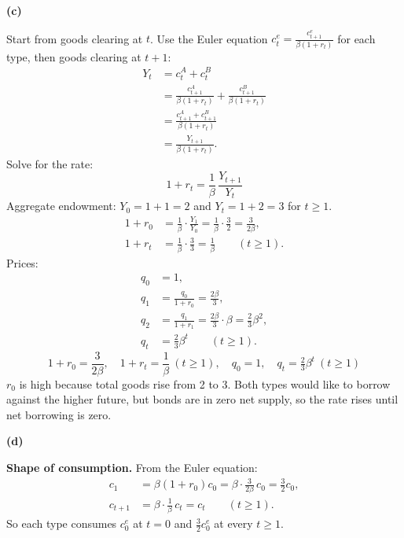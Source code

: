 \documentclass[12pt]{article}
\newcommand{\pt}[1]{\par\bigskip\textbf{(#1)}\par}
\newcommand{\ans}[1]{\[\boxed{\ #1\ }\]}
\begin{document}
\pt{c}
Start from goods clearing at $t$. Use the Euler equation
$c^e_t=\frac{c^e_{t+1}}{\beta(1+r_t)}$ for each type, then goods clearing
at $t+1$:
\begin{align*}
Y_t&=c^A_t+c^B_t\\
&=\frac{c^A_{t+1}}{\beta(1+r_t)}+\frac{c^B_{t+1}}{\beta(1+r_t)}\\
&=\frac{c^A_{t+1}+c^B_{t+1}}{\beta(1+r_t)}\\
&=\frac{Y_{t+1}}{\beta(1+r_t)} .
\end{align*}
Solve for the rate:
\ans{1+r_t=\frac{1}{\beta}\,\frac{Y_{t+1}}{Y_t}}
Aggregate endowment: $Y_0=1+1=2$ and $Y_t=1+2=3$ for $t\ge1$.
\begin{align*}
1+r_0&=\frac1\beta\cdot\frac{Y_1}{Y_0}=\frac1\beta\cdot\frac32=\frac{3}{2\beta},\\
1+r_t&=\frac1\beta\cdot\frac{3}{3}=\frac1\beta\qquad(t\ge1).
\end{align*}
Prices:
\begin{align*}
q_0&=1,\\
q_1&=\frac{q_0}{1+r_0}=\frac{2\beta}{3},\\
q_2&=\frac{q_1}{1+r_1}=\frac{2\beta}{3}\cdot\beta=\frac23\beta^2,\\
q_t&=\frac23\beta^t\qquad(t\ge1).
\end{align*}
\ans{1+r_0=\frac{3}{2\beta},\quad1+r_t=\frac1\beta\ (t\ge1),\quad q_0=1,\quad q_t=\tfrac23\beta^t\ (t\ge1)}
$r_0$ is high because total goods rise from 2 to 3. Both types would like
to borrow against the higher future, but bonds are in zero net supply, so
the rate rises until net borrowing is zero.

\pt{d}
\textbf{Shape of consumption.} From the Euler equation:
\begin{align*}
c_1&=\beta(1+r_0)c_0=\beta\cdot\frac{3}{2\beta}\,c_0=\frac32c_0,\\
c_{t+1}&=\beta\cdot\frac1\beta\,c_t=c_t\qquad(t\ge1).
\end{align*}
So each type consumes $c^e_0$ at $t=0$ and $\frac32c^e_0$ at every $t\ge1$.
\end{document}
